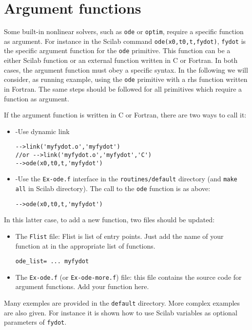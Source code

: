 \section{Argument functions}
Some built-in nonlinear solvers, such as {\tt ode} or {\tt optim}, require a 
specific function as argument. For instance in the Scilab command
{\tt ode(x0,t0,t,fydot)}, {\tt fydot} is the specific argument function
for the {\tt ode} primitive.
This function can be a either Scilab function or an external
function written in C or Fortran.
In both cases, the argument function must obey a specific
syntax. In the following we will consider, as running example, using 
the {\tt ode} primitive with a rhs function written in Fortran. The
same steps should be followed for all primitives which require
a function as argument.

If the argument function is written in C or Fortran, there
are two ways to call it:
\begin{itemize}
\item -Use dynamic link
\begin{verbatim}
-->link('myfydot.o','myfydot')  
//or -->link('myfydot.o','myfydot','C')
-->ode(x0,t0,t,'myfydot')
\end{verbatim}
\item -Use the {\tt Ex-ode.f} interface in the {\tt routines/default}
directory (and {\tt make all} in Scilab directory).
The call to the {\tt ode} function is as above:
\begin{verbatim}
-->ode(x0,t0,t,'myfydot')
\end{verbatim}
\end{itemize}
In this latter case, to add a new function, two files should be updated:
\begin{itemize}
\item The {\tt Flist} file: Flist is list of entry points. Just add the 
name of your function at in the appropriate list of functions.
\begin{verbatim}
ode_list= ... myfydot
\end{verbatim}
\item The {\tt Ex-ode.f} (or {\tt Ex-ode-more.f}) file: this file contains the 
source code for argument functions. Add your function here.
\end{itemize}

Many exemples are provided in the {\tt default} directory.
More complex examples are also given. For instance it is shown 
how to use Scilab variables as optional parameters of {\tt fydot}.


